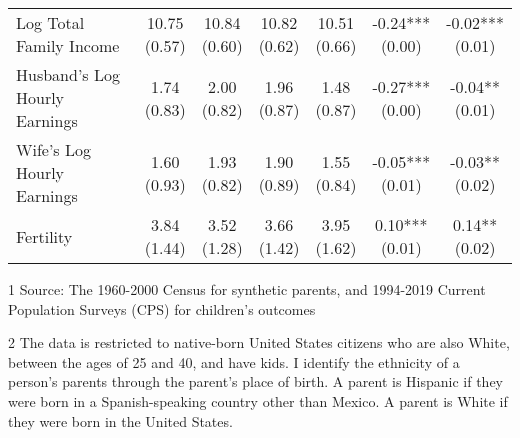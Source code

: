 \begin{table}[H]
{\begin{threeparttable}
\begin{tabular}[t]{>{\raggedright\arraybackslash}p{5cm}cccccc}
Log Total Family Income & \specialcell{10.75\\(0.57)} & \specialcell{10.84\\(0.60)} & \specialcell{10.82\\(0.62)} & \specialcell{10.51\\(0.66)} & \specialcell{-0.24***\\(0.00)} & \specialcell{-0.02***\\(0.01)}\\
Husband's Log Hourly Earnings & \specialcell{1.74\\(0.83)} & \specialcell{2.00\\(0.82)} & \specialcell{1.96\\(0.87)} & \specialcell{1.48\\(0.87)} & \specialcell{-0.27***\\(0.00)} & \specialcell{-0.04**\\(0.01)}\\
\addlinespace
Wife's Log Hourly Earnings & \specialcell{1.60\\(0.93)} & \specialcell{1.93\\(0.82)} & \specialcell{1.90\\(0.89)} & \specialcell{1.55\\(0.84)} & \specialcell{-0.05***\\(0.01)} & \specialcell{-0.03**\\(0.02)}\\
Fertility & \specialcell{3.84\\(1.44)} & \specialcell{3.52\\(1.28)} & \specialcell{3.66\\(1.42)} & \specialcell{3.95\\(1.62)} & \specialcell{0.10***\\(0.01)} & \specialcell{0.14**\\(0.02)}\\
\bottomrule
\end{tabular}
\begin{tablenotes}
\item[1] Source: The 1960-2000 Census for synthetic parents, and 1994-2019 Current Population Surveys (CPS) for children's outcomes
\item[2] The data is restricted to native-born United States citizens who are also White, between the ages of 25 and 40, and have kids. I identify the ethnicity of a person's parents through the parent's place of birth. A parent is Hispanic if they were born in a Spanish-speaking country other than Mexico. A parent is White if they were born in the United States.
\end{tablenotes}
\end{threeparttable}}
\end{table}

